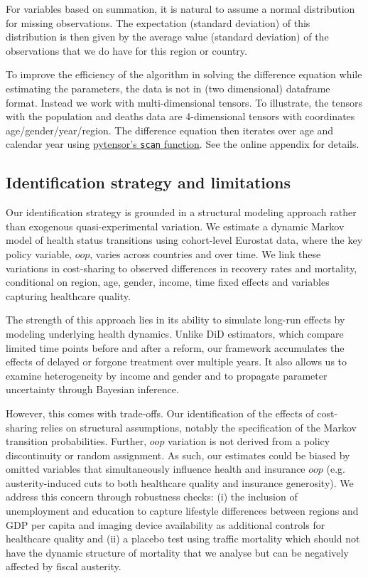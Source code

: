\documentclass[a4paper,12pt]{article}
\begin{document}
For variables based on summation, it is natural to assume a normal distribution for missing observations. The expectation (standard deviation) of this distribution is then given by the average value (standard deviation) of the observations that we do have for this region or country.

To improve the efficiency of the algorithm in solving the difference equation while estimating the parameters, the data is not in (two dimensional) dataframe format. Instead we work with multi-dimensional tensors. To illustrate, the tensors with the population and deaths data are 4-dimensional tensors with coordinates age/gender/year/region. The difference equation then iterates over age and calendar year using \href{https://pytensor.readthedocs.io/en/latest/library/scan.html}{pytensor's \texttt{scan} function}. See the online appendix for details.
\subsection{Identification strategy and limitations}
\label{sec:orgfba3a6a}

Our identification strategy is grounded in a structural modeling approach rather than exogenous quasi-experimental variation. We estimate a dynamic Markov model of health status transitions using cohort-level Eurostat data, where the key policy variable, \(oop\), varies across countries and over time. We link these variations in cost-sharing to observed differences in recovery rates and mortality, conditional on region, age, gender, income, time fixed effects and variables capturing healthcare quality.

The strength of this approach lies in its ability to simulate long-run effects by modeling underlying health dynamics. Unlike DiD estimators, which compare limited time points before and after a reform, our framework accumulates the effects of delayed or forgone treatment over multiple years. It also allows us to examine heterogeneity by income and gender and to propagate parameter uncertainty through Bayesian inference.

However, this comes with trade-offs. Our identification of the effects of cost-sharing relies on structural assumptions, notably the specification of the Markov transition probabilities. Further, \(oop\) variation is not derived from a policy discontinuity or random assignment. As such, our estimates could be biased by omitted variables that simultaneously influence health and insurance \(oop\) (e.g. austerity-induced cuts to both healthcare quality and insurance generosity). We address this concern through robustness checks: (i) the inclusion of unemployment and education to capture lifestyle differences between regions and GDP per capita and imaging device availability as additional controls for healthcare quality and (ii) a placebo test using traffic mortality which should not have the dynamic structure of mortality that we analyse but can be negatively affected by fiscal austerity.
\end{document}
